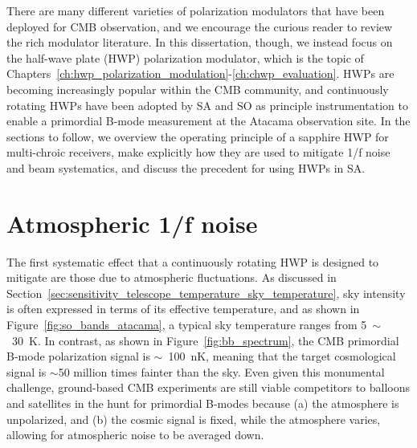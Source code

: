 There are many different varieties of polarization modulators that have been deployed for CMB observation, and we encourage the curious reader to review the rich modulator literature. In this dissertation, though, we instead focus on the half-wave plate (HWP) polarization modulator, which is the topic of Chapters~\ref{ch:hwp_polarization_modulation}-\ref{ch:chwp_evaluation}. HWPs are becoming increasingly popular within the CMB community, and continuously rotating HWPs have been adopted by SA and SO as principle instrumentation to enable a primordial B-mode measurement at the Atacama observation site. In the sections to follow, we overview the operating principle of a sapphire HWP for multi-chroic receivers, make explicitly how they are used to mitigate 1/f noise and beam systematics, and discuss the precedent for using HWPs in SA.


\section{Atmospheric 1/f noise}
\label{sec:atmospheric_1/f_noise}

The first systematic effect that a continuously rotating HWP is designed to mitigate are those due to atmospheric fluctuations. As discussed in Section~\ref{sec:sensitivity_telescope_temperature_sky_temperature}, sky intensity is often expressed in terms of its effective temperature, and as shown in Figure~\ref{fig:so_bands_atacama}, a typical sky temperature ranges from 5~$\sim$~30~K. In contrast, as shown in Figure~\ref{fig:bb_spectrum}, the CMB primordial B-mode polarization signal is $\sim$~100~$\mathrm{n K}$, meaning that the target cosmological signal is $\sim$50 million times fainter than the sky. Even given this monumental challenge, ground-based CMB experiments are still viable competitors to balloons and satellites in the hunt for primordial B-modes because (a) the atmosphere is unpolarized, and (b) the cosmic signal is fixed, while the atmosphere varies, allowing for atmospheric noise to be averaged down.


